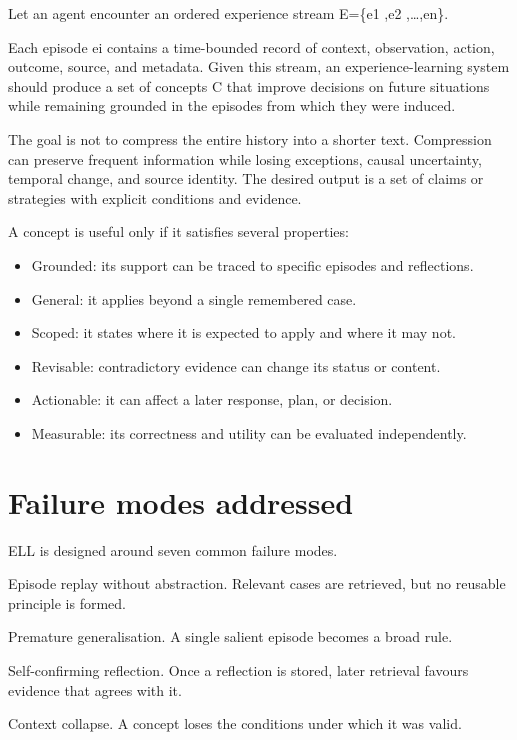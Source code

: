 \documentclass[
  english,
  a4paper,
  DIV=11,
  numbers=noendperiod]{scrreprt}
\begin{document}
Let an agent encounter an ordered experience stream E=\{e1 ,e2
,\ldots,en\}.

Each episode ei contains a time-bounded record of context, observation,
action, outcome, source, and metadata. Given this stream, an
experience-learning system should produce a set of concepts C that
improve decisions on future situations while remaining grounded in the
episodes from which they were induced.

The goal is not to compress the entire history into a shorter text.
Compression can preserve frequent information while losing exceptions,
causal uncertainty, temporal change, and source identity. The desired
output is a set of claims or strategies with explicit conditions and
evidence.

A concept is useful only if it satisfies several properties:

\begin{itemize}
\item
  Grounded: its support can be traced to specific episodes and
  reflections.
\item
  General: it applies beyond a single remembered case.
\item
  Scoped: it states where it is expected to apply and where it may not.
\item
  Revisable: contradictory evidence can change its status or content.
\item
  Actionable: it can affect a later response, plan, or decision.
\item
  Measurable: its correctness and utility can be evaluated
  independently.
\end{itemize}

\section{Failure modes addressed}\label{failure-modes-addressed}

ELL is designed around seven common failure modes.

Episode replay without abstraction. Relevant cases are retrieved, but no
reusable principle is formed.

Premature generalisation. A single salient episode becomes a broad rule.

Self-confirming reflection. Once a reflection is stored, later retrieval
favours evidence that agrees with it.

Context collapse. A concept loses the conditions under which it was
valid.
\end{document}

